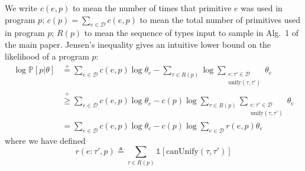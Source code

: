 \documentclass{article}
\DeclareMathOperator*{\argmax}{arg\,max} %
\newcommand{\indicator}{\mathds{1}} %
\newcommand{\expect}{\mathds{E}} %
\newcommand{\probability}{\mathds{P}} %
\begin{document}
We write $c(e,p)$ to mean the number of times that primitive $e$ was used in program $p$; $c(p)= \sum_{e\in \mathcal{D}}c(e,p)$ to mean the total number of primitives used in program $p$; $R(p)$ to mean the sequence of types input to sample in Alg.~1 of the main paper. Jensen's inequality gives an intuitive lower bound on the likelihood of a program $p$:
\begin{align*}
  \log \probability[p|\theta]&\stackrel{+}{ = }\sum_{e\in \mathcal{D}} c(e,p)\log \theta_e - \sum_{\tau\in R(p)} \log \sum_{\substack{e:\tau'\in \mathcal{D}\\\text{unify}(\tau,\tau')}}\theta_e\\
  &\stackrel{+}{\geq }\sum_{e\in \mathcal{D}} c(e,p)\log \theta_e - c(p)\log \sum_{\tau\in R(p)} \sum_{\substack{e:\tau'\in \mathcal{D}\\\text{unify}(\tau,\tau')}}\theta_e\\
  & = \sum_{e\in \mathcal{D}} c(e,p)\log \theta_e - c(p)\log \sum_{e\in \mathcal{D}} r(e,p)\theta_e
\end{align*}
where we have defined
$$r(e:\tau',p)\triangleq\sum_{\tau\in R(p)} \indicator[\text{canUnify}(\tau,\tau')]$$

\end{document}
